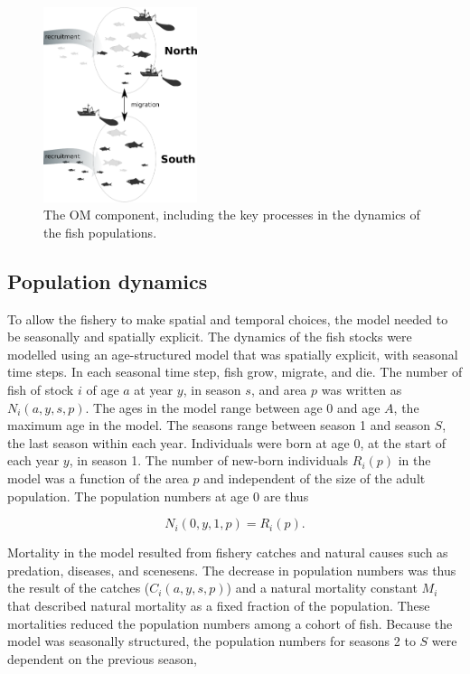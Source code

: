 \documentclass[12pt,oneline,a4paper,numbib]{ouparticle}
\numberwithin{equation}{subsection} %
\begin{document}
\begin{figure}[!h]
\centering
\includegraphics[width=0.4\textwidth]{Figures/Areadynamics.eps} 
\caption{The OM component, including the key processes in the dynamics of the fish populations.}
\label{fig:stockdyn}
\end{figure}

\subsection{Population dynamics}


To allow the fishery to make spatial and temporal choices, the model needed to be seasonally and spatially explicit. The dynamics of the fish stocks were modelled using an age-structured model that was spatially explicit, with seasonal time steps. In each seasonal time step, fish grow, migrate, and die. The number of fish of stock $i$ of age $a$ at year $y$, in season $s$, and area $p$ was written as $N_i (a, y, s, p)$.  The ages in the model range between age 0 and age $A$, the maximum age in the model. The seasons range between season 1 and season $S$, the last season within each year. Individuals were born at age 0, at the start of each year $y$, in season 1. The number of new-born individuals $R_i (p)$ in the model was a function of the area $p$ and independent of the size of the adult population. The population numbers at age 0 are thus
 
\begin{equation}
N_i (0, y, 1, p) = R_i (p).
\end{equation}

Mortality in the model resulted from fishery catches and natural causes such as predation, diseases, and scenesens. The decrease in population numbers was thus the result of the catches ($C_i (a, y, s, p)$) and a natural mortality constant $M_i$ that described natural mortality as a fixed fraction of the population. These mortalities reduced the population numbers among a cohort of fish. Because the model was seasonally structured, the population numbers for seasons 2 to $S$ were dependent on the previous season,
\end{document}
